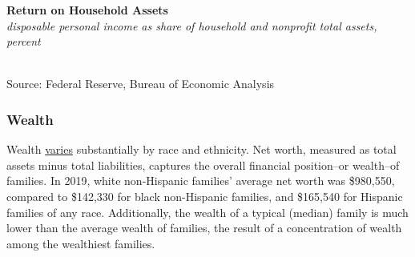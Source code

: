 \documentclass{report}
\makeatletter
\newcommand{\tbllink}[1]{\href{https://raw.githubusercontent.com/bdecon/US-chartbook/master/chartbook/data/#1}{\faTable}}
\newcommand*\short[1]{\expandafter\@gobbletwo\number\numexpr#1\relax}
\newcommand{\dateaxisticks}{
		date coordinates in=x, axis line style={draw=none},
		xmax={2023-10-01},
		max space between ticks=40,	    
		xtick={{1990-01-01}, {1992-01-01}, {1994-01-01}, 
			{1996-01-01}, {1998-01-01}, {2000-01-01}, 
			{2002-01-01}, {2004-01-01}, {2006-01-01},
			{2008-01-01}, {2010-01-01}, {2012-01-01}, {2014-01-01},
		    {2016-01-01}, {2018-01-01}, {2020-01-01}, {2022-01-01}, 
		    {2024-01-01}, {2026-01-01}},
		minor xtick={{1989-01-01}, {1991-01-01}, {1993-01-01},
			{1995-01-01}, {1997-01-01}, {1999-01-01}, 
			{2001-01-01}, {2003-01-01}, {2005-01-01}, {2007-01-01},
		    {2009-01-01}, {2011-01-01}, {2013-01-01}, {2015-01-01},
		    {2017-01-01}, {2019-01-01}, {2021-01-01}, {2023-01-01}, 
		    {2025-01-01}, {2027-01-01}},
		enlarge y limits={0.06}, enlarge x limits={0.01},
		}
\newcommand{\bbar}[2]{extra #1 ticks = {{#2}}, extra #1 tick labels = ,
		extra #1 tick style = {grid=major, grid style={thick, black!25}},}
\newcommand{\stdline}[4]{\addplot[very thick, no markers, color=#1] 
		table [x=#2, y=#3, col sep=comma] {#4};	}
\newcommand{\rbars}{
		\fill[color=black!10] (axis cs:{1990-07-01},\pgfkeysvalueof{/pgfplots/ymin}) rectangle 
			(axis cs:{1991-03-01}, \pgfkeysvalueof{/pgfplots/ymax});
		\fill[color=black!10] (axis cs:{2007-12-01},\pgfkeysvalueof{/pgfplots/ymin}) rectangle 
			(axis cs:{2009-07-01}, \pgfkeysvalueof{/pgfplots/ymax});
		\fill[color=black!10] (axis cs:{2001-03-01},\pgfkeysvalueof{/pgfplots/ymin}) rectangle 
			(axis cs:{2001-11-01}, \pgfkeysvalueof{/pgfplots/ymax});
		\fill[color=black!10] (axis cs:{2020-02-01},\pgfkeysvalueof{/pgfplots/ymin}) rectangle 
			(axis cs:{2020-05-01}, \pgfkeysvalueof{/pgfplots/ymax});}
\makeatother
\begin{document}
{\begin{minipage}{0.76\textwidth}
\normalsize \textbf{Return on Household Assets}\\
\footnotesize{\textit{disposable personal income as share of household and nonprofit total assets, percent}}\\
\hspace*{-2mm} \\
\footnotesize{Source: Federal Reserve, Bureau of Economic Analysis} \hfill \tbllink{dpish.csv}
\end{minipage}
\newpage
\begin{minipage}{0.76\textwidth}   
\subsubsection*{Wealth}
\small Wealth \href{https://www.federalreserve.gov/econres/notes/feds-notes/disparities-in-wealth-by-race-and-ethnicity-in-the-2019-survey-of-consumer-finances-20200928.htm}{varies} substantially by race and ethnicity. Net worth, measured as total assets minus total liabilities, captures the overall financial position--or wealth--of families. In 2019, white non-Hispanic families' average net worth was \$980,550, compared to \$142,330 for black non-Hispanic families, and \$165,540 for Hispanic families of any race. Additionally, the wealth of a typical (median) family is much lower than the average wealth of families, the result of a concentration of wealth among the wealthiest families.


\end{minipage}}
\end{document}
